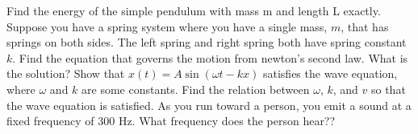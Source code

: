 \documentclass[12pt]{article}
\begin{document}
\noindent Find the energy of the simple pendulum with mass m and length L exactly.  
\newpage
\noindent Suppose you have a spring system where you have a single mass, $m$, that has springs on both sides.  The left spring and right spring both have spring constant $k$.  Find the equation that governs the motion from newton's second law.  What is the solution? 
\newpage 
\noindent Show that $x(t) = A\sin(\omega t - k x)$ satisfies the wave equation, where $\omega$ and $k$ are some constants.  Find the relation between $\omega$, $k$, and $v$ so that the wave equation is satisfied.
\newpage
\noindent As you run toward a person, you emit a sound at a fixed frequency of 300 Hz. What frequency does the person hear?? 
\end{document}
